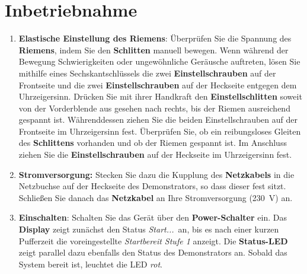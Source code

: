 %
%

\chapter{Inbetriebnahme}

\begin{enumerate} \label{STU}

	\item \textbf{Elastische Einstellung des Riemens}: Überprüfen Sie die Spannung des \textbf{Riemens}, indem Sie den \textbf{Schlitten} manuell bewegen. Wenn während der Bewegung Schwierigkeiten oder ungewöhnliche Geräusche auftreten, lösen Sie mithilfe eines Sechskantschlüssels die zwei \textbf{Einstellschrauben} auf der Frontseite und die zwei \textbf{Einstellschrauben} auf der Heckseite entgegen dem Uhrzeigersinn. Drücken Sie mit ihrer Handkraft den \textbf{Einstellschlitten} soweit von der Vorderblende aus gesehen nach rechts, bis der Riemen ausreichend gespannt ist. Währenddessen ziehen Sie die beiden Einstellschrauben auf der Frontseite im Uhrzeigersinn fest. Überprüfen Sie, ob ein reibungsloses Gleiten des \textbf{Schlittens} vorhanden und ob der Riemen gespannt ist. Im Anschluss ziehen Sie die \textbf{Einstellschrauben} auf der Heckseite im Uhrzeigersinn fest. 
	
	\item \textbf{Stromversorgung:} Stecken Sie dazu die Kupplung des \textbf{Netzkabels} in die Netzbuchse auf der Heckseite des Demonstrators, so dass dieser fest sitzt. Schließen Sie danach das \textbf{Netzkabel} an Ihre Stromversorgung (230\ V) an.
	
	\item \textbf{Einschalten}: Schalten Sie das Gerät über den \textbf{Power-Schalter} ein. Das \textbf{Display} zeigt zunächst den Status \glqq \textit{Start...}\grqq \ an, bis es nach einer kurzen Pufferzeit die voreingestellte \textit{\glqq Startbereit Stufe 1\grqq} anzeigt.
	Die \textbf{Status-LED} zeigt parallel dazu ebenfalls den Status des Demonstrators an. Sobald das System bereit ist, leuchtet die LED \textit{rot}.
\begin{center}	
\end{center}
\end{enumerate}
